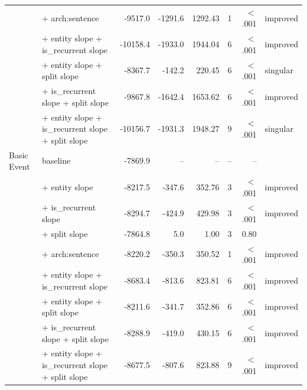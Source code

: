 \begin{longtable}{@{}llrrrrrl@{}}
 & + arch:sentence & -9517.0 & -1291.6 & 1292.43 & 1 & $<$.001 & improved \\
 & + entity slope + is\_recurrent slope & -10158.4 & -1933.0 & 1944.04 & 6 & $<$.001 & improved \\
 & + entity slope + split slope & -8367.7 & -142.2 & 220.45 & 6 & $<$.001 & singular \\
 & + is\_recurrent slope + split slope & -9867.8 & -1642.4 & 1653.62 & 6 & $<$.001 & improved \\
 & + entity slope + is\_recurrent slope + split slope & -10156.7 & -1931.3 & 1948.27 & 9 & $<$.001 & singular \\
\addlinespace
Basic Event & baseline & -7869.9 & -- & -- & -- & -- &  \\
 & + entity slope & -8217.5 & -347.6 & 352.76 & 3 & $<$.001 & improved \\
 & + is\_recurrent slope & -8294.7 & -424.9 & 429.98 & 3 & $<$.001 & improved \\
 & + split slope & -7864.8 & 5.0 & 1.00 & 3 & 0.80 &  \\
 & + arch:sentence & -8220.2 & -350.3 & 350.52 & 1 & $<$.001 & improved \\
 & + entity slope + is\_recurrent slope & -8683.4 & -813.6 & 823.81 & 6 & $<$.001 & improved \\
 & + entity slope + split slope & -8211.6 & -341.7 & 352.86 & 6 & $<$.001 & improved \\
 & + is\_recurrent slope + split slope & -8288.9 & -419.0 & 430.15 & 6 & $<$.001 & improved \\
 & + entity slope + is\_recurrent slope + split slope & -8677.5 & -807.6 & 823.88 & 9 & $<$.001 & improved \\
\end{longtable}
\normalsize
